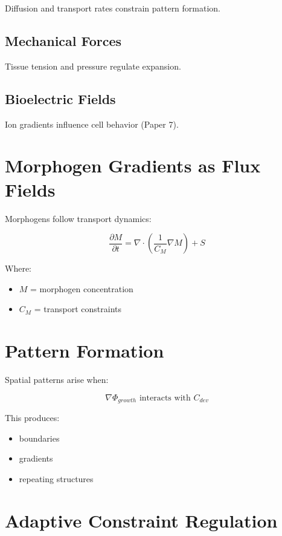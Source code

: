 \documentclass[11pt]{article}
\begin{document}
Diffusion and transport rates constrain pattern formation.

\subsection{Mechanical Forces}

Tissue tension and pressure regulate expansion.

\subsection{Bioelectric Fields}

Ion gradients influence cell behavior (Paper 7).

\section{Morphogen Gradients as Flux Fields}

Morphogens follow transport dynamics:

\begin{equation}
\frac{\partial M}{\partial t} = \nabla \cdot \left(\frac{1}{C_M} \nabla M \right) + S
\end{equation}

Where:

\begin{itemize}
    \item $M$ = morphogen concentration
    \item $C_M$ = transport constraints
\end{itemize}

\section{Pattern Formation}

Spatial patterns arise when:

\begin{equation}
\nabla \Phi_{growth} \text{ interacts with } C_{dev}
\end{equation}

This produces:

\begin{itemize}
    \item boundaries
    \item gradients
    \item repeating structures
\end{itemize}

\section{Adaptive Constraint Regulation}
\end{document}

